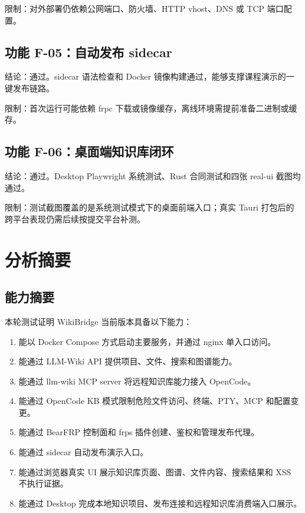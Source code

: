\documentclass[UTF8,a4paper,12pt,fontset=fandol]{ctexart}
\begin{document}
限制：对外部署仍依赖公网端口、防火墙、HTTP vhost、DNS 或 TCP 端口配置。

\subsection{功能 F-05：自动发布 sidecar}
结论：通过。sidecar 语法检查和 Docker 镜像构建通过，能够支撑课程演示的一键发布链路。

限制：首次运行可能依赖 frpc 下载或镜像缓存，离线环境需提前准备二进制或缓存。

\subsection{功能 F-06：桌面端知识库闭环}
结论：通过。Desktop Playwright 系统测试、Rust 合同测试和四张 real-ui 截图均通过。

限制：测试截图覆盖的是系统测试模式下的桌面前端入口；真实 Tauri 打包后的跨平台表现仍需后续按提交平台补测。

\section{分析摘要}

\subsection{能力摘要}
本轮测试证明 WikiBridge 当前版本具备以下能力：
\begin{enumerate}
  \item 能以 Docker Compose 方式启动主要服务，并通过 nginx 单入口访问。
  \item 能通过 LLM-Wiki API 提供项目、文件、搜索和图谱能力。
  \item 能通过 llm-wiki MCP server 将远程知识库能力接入 OpenCode。
  \item 能通过 OpenCode KB 模式限制危险文件访问、终端、PTY、MCP 和配置变更。
  \item 能通过 BearFRP 控制面和 frps 插件创建、鉴权和管理发布代理。
  \item 能通过 sidecar 自动发布演示入口。
  \item 能通过浏览器真实 UI 展示知识库页面、图谱、文件内容、搜索结果和 XSS 不执行证据。
  \item 能通过 Desktop 完成本地知识项目、发布连接和远程知识库消费端入口展示。
\end{enumerate}
\end{document}
